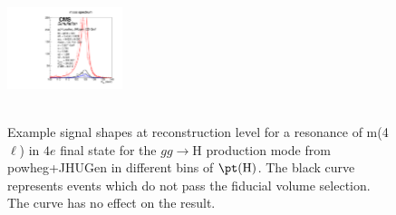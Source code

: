\begin{figure}[htb]
\begin{center}
{      \includegraphics[width=0.3\textwidth,angle=0]{Figures/Appendix//ggH_powheg_JHUgen_125_4e_pT4l_genbin4_recobin4_effs_genWeight*pileupWeight*dataMCWeight.pdf}
      \label{fig:sigfits-pT4l-ggH-powheg15-JHUgen-125-maintext:e}
    }
     \\
    \\
    \caption{ Example signal shapes at reconstruction level for a resonance of m(4$\ell$) in $4e$ final state for the $gg\rightarrow \mathrm{H}$ production mode from {\sc powheg+JHUGen} in different bins of $\pt(\mathrm{H})$. The black curve represents events which do not pass the fiducial volume selection. The curve has no effect on the result.
    }
  \label{fig:sigfits-pT4l-ggH-powheg15-JHUgen-125-maintext}
 \end{center}
\end{figure} \clearpage


